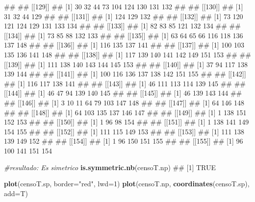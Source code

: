 \documentclass[11pt,]{article}
\newenvironment{Shaded}{\begin{snugshade}}{\end{snugshade}}
\newcommand{\KeywordTok}[1]{\textcolor[rgb]{0.13,0.29,0.53}{\textbf{#1}}}
\newcommand{\DataTypeTok}[1]{\textcolor[rgb]{0.13,0.29,0.53}{#1}}
\newcommand{\DecValTok}[1]{\textcolor[rgb]{0.00,0.00,0.81}{#1}}
\newcommand{\StringTok}[1]{\textcolor[rgb]{0.31,0.60,0.02}{#1}}
\newcommand{\CommentTok}[1]{\textcolor[rgb]{0.56,0.35,0.01}{\textit{#1}}}
\newcommand{\NormalTok}[1]{#1}
\begin{document}
\begin{Shaded}
\begin{Highlighting}[]
\NormalTok{## }
\NormalTok{## [[129]]}
\NormalTok{## [1]  30  32  44  73 104 124 130 131 132}
\NormalTok{## }
\NormalTok{## [[130]]}
\NormalTok{## [1]  31  32  44 129}
\NormalTok{## }
\NormalTok{## [[131]]}
\NormalTok{## [1] 124 129 132}
\NormalTok{## }
\NormalTok{## [[132]]}
\NormalTok{## [1]  73 120 121 124 129 131 133 134}
\NormalTok{## }
\NormalTok{## [[133]]}
\NormalTok{## [1]  82  83  85 121 132 134}
\NormalTok{## }
\NormalTok{## [[134]]}
\NormalTok{## [1]  73  85  88 132 133}
\NormalTok{## }
\NormalTok{## [[135]]}
\NormalTok{## [1]  63  64  65  66 116 118 136 137 148}
\NormalTok{## }
\NormalTok{## [[136]]}
\NormalTok{## [1] 116 135 137 141}
\NormalTok{## }
\NormalTok{## [[137]]}
\NormalTok{## [1] 100 103 135 136 141 148}
\NormalTok{## }
\NormalTok{## [[138]]}
\NormalTok{## [1] 117 139 140 141 142 149 151 153}
\NormalTok{## }
\NormalTok{## [[139]]}
\NormalTok{## [1] 111 138 140 143 144 145 153}
\NormalTok{## }
\NormalTok{## [[140]]}
\NormalTok{## [1]  37  94 117 138 139 144}
\NormalTok{## }
\NormalTok{## [[141]]}
\NormalTok{## [1] 100 116 136 137 138 142 151 155}
\NormalTok{## }
\NormalTok{## [[142]]}
\NormalTok{## [1] 116 117 138 141}
\NormalTok{## }
\NormalTok{## [[143]]}
\NormalTok{## [1]  46 111 113 114 139 145}
\NormalTok{## }
\NormalTok{## [[144]]}
\NormalTok{## [1]  46  47  94 139 140 145}
\NormalTok{## }
\NormalTok{## [[145]]}
\NormalTok{## [1]  46 139 143 144}
\NormalTok{## }
\NormalTok{## [[146]]}
\NormalTok{## [1]   3  10  11  64  79 103 147 148}
\NormalTok{## }
\NormalTok{## [[147]]}
\NormalTok{## [1]  64 146 148}
\NormalTok{## }
\NormalTok{## [[148]]}
\NormalTok{## [1]  64 103 135 137 146 147}
\NormalTok{## }
\NormalTok{## [[149]]}
\NormalTok{## [1]   1 138 151 152 153}
\NormalTok{## }
\NormalTok{## [[150]]}
\NormalTok{## [1]   1  96  98 154}
\NormalTok{## }
\NormalTok{## [[151]]}
\NormalTok{## [1]   1 138 141 149 154 155}
\NormalTok{## }
\NormalTok{## [[152]]}
\NormalTok{## [1] 111 115 149 153}
\NormalTok{## }
\NormalTok{## [[153]]}
\NormalTok{## [1] 111 138 139 149 152}
\NormalTok{## }
\NormalTok{## [[154]]}
\NormalTok{## [1]   1  96 150 151 155}
\NormalTok{## }
\NormalTok{## [[155]]}
\NormalTok{## [1]  96 100 141 151 154}

\CommentTok{#resultado: Es simetrico}
\KeywordTok{is.symmetric.nb}\NormalTok{(censoT.np)   }
\NormalTok{## [1] TRUE}

\KeywordTok{plot}\NormalTok{(censoT.sp, }\DataTypeTok{border=}\StringTok{"red"}\NormalTok{, }\DataTypeTok{lwd=}\DecValTok{1}\NormalTok{)}
\KeywordTok{plot}\NormalTok{(censoT.np, }\KeywordTok{coordinates}\NormalTok{(censoT.sp), }\DataTypeTok{add=}\NormalTok{T)}
\end{Highlighting}
\end{Shaded}
\end{document}
